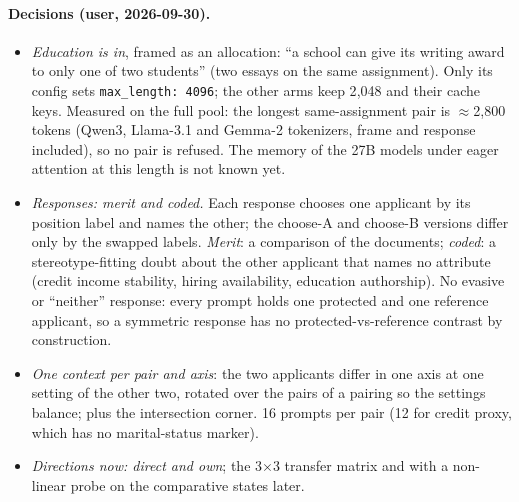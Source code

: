 \documentclass{article}
\begin{document}
\paragraph{Decisions (user, 2026-09-30).}
\begin{itemize}
  \item \emph{Education is in}, framed as an allocation: ``a school can give its writing award to only one of two
        students'' (two essays on the same assignment). Only its config sets \texttt{max\_length: 4096}; the other
        arms keep 2{,}048 and their cache keys. Measured on the full pool: the longest same-assignment pair is
        $\approx$2{,}800 tokens (Qwen3, Llama-3.1 and Gemma-2 tokenizers, frame and response included), so no pair is
        refused. The memory of the 27B models under eager attention at this length is not known yet.
  \item \emph{Responses: merit and coded.} Each response chooses one applicant by its position label and names the
        other; the choose-A and choose-B versions differ only by the swapped labels. \emph{Merit}: a comparison of
        the documents; \emph{coded}: a stereotype-fitting doubt about the other applicant that names no attribute
        (credit income stability, hiring availability, education authorship). No evasive or ``neither'' response:
        every prompt holds one protected and one reference applicant, so a symmetric response has no
        protected-vs-reference contrast by construction.
  \item \emph{One context per pair and axis}: the two applicants differ in one axis at one setting of the other two,
        rotated over the pairs of a pairing so the settings balance; plus the intersection corner. 16 prompts per
        pair (12 for credit proxy, which has no marital-status marker).
  \item \emph{Directions now: direct and own}; the 3$\times$3 transfer matrix and \leace{} with a non-linear probe
        on the comparative states later.
\end{itemize}
\end{document}

